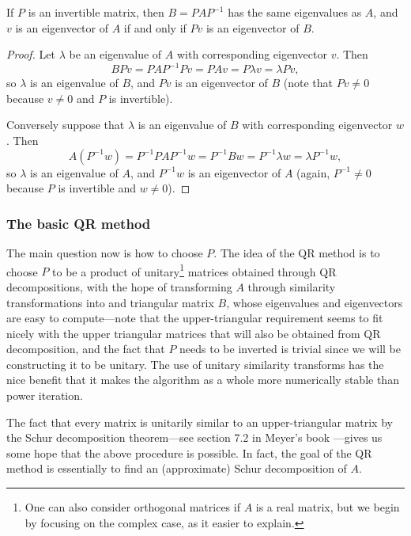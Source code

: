 \documentclass{article}
\begin{document}
\begin{theorem}
	\label{thm:similarity}
	If $P$ is an invertible matrix, then $B = PAP^{-1}$ has the same eigenvalues as $A$, and $v$ is an eigenvector of $A$ if and only if $Pv$ is an eigenvector of $B$.
\end{theorem}
\begin{proof}
	Let $\lambda$ be an eigenvalue of $A$ with corresponding eigenvector $v$. Then
	\begin{equation*}
		BPv = PAP^{-1}Pv = PAv = P\lambda v = \lambda Pv,
	\end{equation*}
	so $\lambda$ is an eigenvalue of $B$, and $Pv$ is an eigenvector of $B$ (note that $Pv\ne 0$ because $v\ne 0$ and $P$ is invertible).
	
	Conversely suppose that $\lambda$ is an eigenvalue of $B$ with corresponding eigenvector $w$. Then
	\begin{equation*}
		A(P^{-1}w) = P^{-1}PAP^{-1}w = P^{-1}Bw = P^{-1}\lambda w = \lambda P^{-1}w,
	\end{equation*}
	so $\lambda$ is an eigenvalue of $A$, and $P^{-1}w$ is an eigenvector of $A$ (again, $P^{-1}\ne 0$ because $P$ is invertible and $w\ne0$).
\end{proof}

\subsubsection*{The basic QR method}

The main question now is how to choose $P$. The idea of the QR method is to choose $P$ to be a product of unitary\footnote{One can also consider orthogonal matrices if $A$ is a real matrix, but we begin by focusing on the complex case, as it easier to explain.} matrices obtained through QR decompositions, with the hope of transforming $A$ through similarity transformations into and triangular matrix $B$, whose eigenvalues and eigenvectors are easy to compute---note that the upper-triangular requirement seems to fit nicely with the upper triangular matrices that will also be obtained from QR decomposition, and the fact that $P$ needs to be inverted is trivial since we will be constructing it to be unitary. The use of unitary similarity transforms has the nice benefit that it makes the algorithm as a whole more numerically stable than power iteration.

The fact that every matrix is unitarily similar to an upper-triangular matrix by the Schur decomposition theorem---see section 7.2 in Meyer's book \cite{meyer_2008}---gives us some hope that the above procedure is possible. In fact, the goal of the QR method is essentially to find an (approximate) Schur decomposition of $A$.
\end{document}
